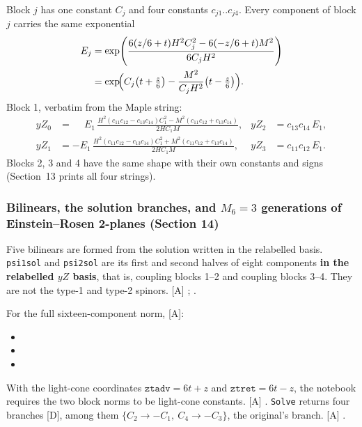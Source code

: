 Block $j$ has one constant $C_j$ and four constants $c_{j1}..c_{j4}$. Every component of block $j$
carries the same exponential
\begin{align}
  E_j&=\exp\!\left(\frac{6(z/6+t)H^2C_j^2-6(-z/6+t)M^2}{6C_jH^2}\right)\notag\\
     &=\exp\!\Bigl(C_j\bigl(t+\tfrac z6\bigr)-\frac{M^2}{C_jH^2}\bigl(t-\tfrac z6\bigr)\Bigr).
\end{align}
Block 1, verbatim from the Maple string:
\begin{align*}
yZ_0 &= \phantom{-}E_1\,\frac{H^2(c_{11}c_{12}-c_{13}c_{14})C_1^2 - M^2(c_{11}c_{12}+c_{13}c_{14})}{2HC_1M}, &
yZ_2 &= c_{13}c_{14}\,E_1,\\
yZ_1 &= -E_1\,\frac{H^2(c_{11}c_{12}-c_{13}c_{14})C_1^2 + M^2(c_{11}c_{12}+c_{13}c_{14})}{2HC_1M}, &
yZ_3 &= c_{11}c_{12}\,E_1.
\end{align*}
Blocks 2, 3 and 4 have the same shape with their own constants and signs (Section~13 prints all
four strings).

\subsubsection{Bilinears, the solution branches, and \texorpdfstring{$M_6=3$}{M6 = 3} generations of Einstein--Rosen 2-planes (Section 14)}
\label{fnd:M6}\label{sec:3.1.10}

Five bilinears are formed from the solution written in the relabelled basis.
\texttt{psi1sol} and \texttt{psi2sol} are its first and second halves of eight components
\textbf{in the relabelled $yZ$ basis}, that is, coupling blocks 1--2 and coupling blocks 3--4.
They are not the type-1 and type-2 spinors. [A]
;
.

For the full sixteen-component norm, [A]:
\begin{itemize}
  \item {}
  \item {}
  \item {}
\end{itemize}

With the light-cone coordinates $\texttt{ztadv}=6t+z$ and $\texttt{ztret}=6t-z$, the notebook
requires the two block norms to be light-cone constants. [A]
. \texttt{Solve} returns four branches
[D], among them $\{C_2\to-C_1,\ C_4\to-C_3\}$, the original's branch. [A]
.


